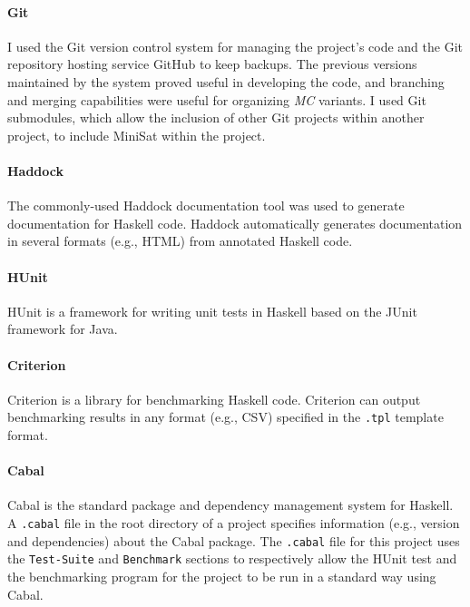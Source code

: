 \documentclass[12pt,a4paper,twoside,openright]{report}
\begin{document}
\paragraph{Git}{
I used the Git version control system \cite{git}
for managing the project's code and the Git repository
hosting service GitHub \cite{github} to
keep backups.
The previous versions maintained by the system proved useful in
developing the code, and branching and merging capabilities were
useful for organizing \emph{MC} variants.
I used Git submodules, which allow the inclusion of other Git projects within another
project, to include MiniSat within the project.

\paragraph{Haddock}{
The commonly-used Haddock \cite{haddock} documentation tool was used to generate documentation
for Haskell code. Haddock automatically generates documentation in
several formats (e.g., HTML) from annotated Haskell code.
}

\paragraph{HUnit}{
HUnit \cite{hunit} is a framework for writing unit tests in Haskell based on the
JUnit framework \cite{junit} for Java.
}

\paragraph{Criterion}{
Criterion \cite{criterion} is a library for benchmarking Haskell code.
Criterion can output benchmarking results in any format (e.g., CSV) specified in the \verb,.tpl,
template format.}

\paragraph{Cabal}{
Cabal \cite{cabal} is the standard package and dependency management system for Haskell.
A \verb,.cabal, file in the root directory of a project specifies
information (e.g., version and dependencies) about the Cabal package.
The \verb,.cabal, file for this project uses the \verb,Test-Suite, and \verb,Benchmark,
sections to respectively allow the HUnit test and the benchmarking
program for the project to be run in a standard way using Cabal.

}}
\end{document}
